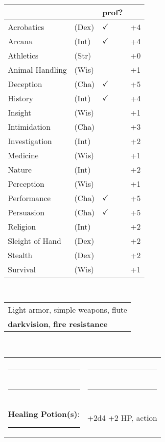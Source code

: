 \documentclass[twocolumn]{article}
\begin{document}
\\
\noindent\begin{tabular}{llll}
 & & prof? & \\
\hline
Acrobatics & (Dex) & $\checkmark$ &+4 \\
Arcana & (Int) & $\checkmark$ & +4 \\ 
Athletics & (Str) &  & +0\\
Animal Handling & (Wis) &  & +1\\
Deception & (Cha) & $\checkmark$ & +5\\
History & (Int) & $\checkmark$ & +4 \\
Insight & (Wis) &  & +1 \\
Intimidation & (Cha) &  & +3 \\
Investigation & (Int) &  & +2 \\
Medicine & (Wis) &  & +1 \\
Nature & (Int) &  & +2 \\
Perception & (Wis) &  & +1 \\
Performance & (Cha) & $\checkmark$ & +5 \\
Persuasion & (Cha) & $\checkmark$ & +5 \\
Religion & (Int) &  & +2 \\
Sleight of Hand & (Dex) &  & +2 \\
Stealth & (Dex) &  & +2 \\
Survival & (Wis) &  & +1 \\
\hline
\end{tabular}
\vspace{12pt}

\\
\noindent\begin{tabular}{|m{3.1in}|}
\hline
Light armor, simple weapons, flute \\
\textbf{darkvision}, \textbf{fire resistance} \\
\hline
\end{tabular}
\vspace{12pt}


\\
\noindent\begin{tabular}{|ll|}
\hline&\\
\rule{1.4in}{.2pt}&\rule{1.4in}{.2pt}\\
\rule{1.4in}{.2pt}&\rule{1.4in}{.2pt}\\
\textbf{Healing Potion(s)}: \rule{.2in}{.2pt}& +2d4 +2 HP, {\sc action}\\
\hline
\end{tabular}
\vspace{12pt}
\end{document}
